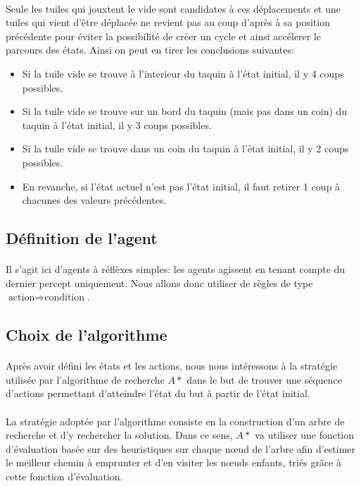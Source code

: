 \documentclass[10pt,a4paper]{report}
\begin{document}
\paragraph{}{Seule les tuiles qui jouxtent le vide sont candidates à ces déplacements et une tuiles qui vient d'être déplacée ne revient pas au coup d'après à sa position précédente pour éviter la possibilité de créer un cycle et ainsi accélerer le parcours des états. Ainsi on peut en tirer les conclusions suivantes:}
\begin{itemize}
\item Si la tuile vide se trouve à l'interieur du taquin à l'état initial, il y 4 coups possibles.
\item Si la tuile vide se trouve sur un bord du taquin (mais pas dans un coin) du taquin à l'état initial, il y 3 coups possibles.
\item Si la tuile vide se trouve dans un coin du taquin à l'état initial, il y 2 coups possibles.
\item En revanche, si l'état actuel n'est pas l'état initial, il faut retirer 1 coup à chacunes des valeurs précédentes.
\end{itemize}
\subsection{Définition de l'agent}
\paragraph{}{Il s'agit ici d'agents à réflèxes simples: les agents agissent en tenant compte du dernier percept uniquement. Nous allons donc utiliser de règles de type $\textrm{action} \Longrightarrow \textrm{condition}$}.
\subsection{Choix de l’algorithme}
\paragraph{}{Après avoir défini les états et les actions, nous nous intéressons à la stratégie utilisée par l’algorithme de recherche ${A*}$ dans le but de trouver une séquence d’actions permettant d’atteindre l’état du but à partir de l’état initial.}
\paragraph{}{La stratégie adoptée par l’algorithme consiste en la construction d'un arbre de recherche et d’y rechercher la solution. Dans ce sens, ${A*}$ va utiliser une fonction d'évaluation basée sur des heuristiques sur chaque nœud de l'arbre afin d’estimer le meilleur chemin à emprunter et d'en visiter les nœuds enfants, triés grâce à cette fonction d'évaluation.}
\end{document}
